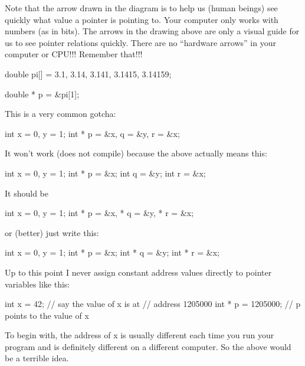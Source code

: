 Note that the arrow drawn in the diagram is to help us (human beings) see quickly what value a pointer is pointing to. Your computer only works with numbers (as in bits). The arrows in the drawing above are only a visual guide for us to see pointer relations quickly. There are no ``hardware arrows'' in your computer or CPU!!! Remember that!!!




\begin{consolethree}[escapeinside=||]

double pi[] = {3.1, 3.14, 3.141, 3.1415, 3.14159};

double * p = &pi[1];
\end{consolethree}




\newpage{}

This is a very common gotcha:

\begin{consolethree}[escapeinside=||]
int x = 0, y = 1;
int * p = &x, q = &y, r = &x;
\end{consolethree}
It won't work (does not compile) because the above actually means this:

\begin{consolethree}[escapeinside=||]
int x = 0, y = 1;
int * p = \&x;
int q = \&y;
int r = \&x;
\end{consolethree}
It should be

\begin{consolethree}[escapeinside=||]
int x = 0, y = 1;
int * p = \&x, * q = \&y, * r = \&x;
\end{consolethree}
or (better) just write this:

\begin{consolethree}[escapeinside=||]
int x = 0, y = 1;
int * p = \&x;
int * q = \&y;
int * r = \&x;
\end{consolethree}

\newpage{}

Up to this point I never assign constant address values directly to
pointer variables like this:

\begin{consolethree}[escapeinside=||]
int x = 42;         // say the value of x is at
                    // address 1205000
int * p = 1205000;  // p points to the value of x
\end{consolethree}
To begin with, the address of x is usually different each time you run your program and is definitely different on a different computer. So the above would be a terrible idea.

